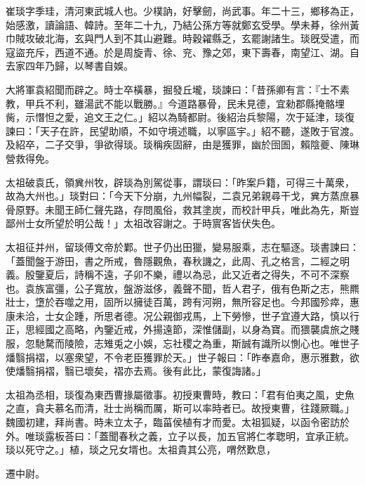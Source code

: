 \begin{pinyinscope}


崔琰字季珪，清河東武城人也。少樸訥，好擊劒，尚武事。年二十三，鄉移為正，始感激，讀論語、韓詩。至年二十九，乃結公孫方等就鄭玄受學。學未朞，徐州黃巾賊攻破北海，玄與門人到不其山避難。時穀糴縣乏，玄罷謝諸生。琰旣受遣，而寇盜充斥，西道不通。於是周旋青、徐、兖、豫之郊，東下壽春，南望江、湖。自去家四年乃歸，以琴書自娛。




大將軍袁紹聞而辟之。時士卒橫暴，掘發丘壠，琰諫曰：「昔孫卿有言：『士不素教，甲兵不利，雖湯武不能以戰勝。』今道路暴骨，民未見德，宜勑郡縣掩骼埋胔，示憯怛之愛，追文王之仁。」紹以為騎都尉。後紹治兵黎陽，次于延津，琰復諫曰：「天子在許，民望助順，不如守境述職，以寧區宇。」紹不聽，遂敗于官渡。及紹卒，二子交爭，爭欲得琰。琰稱疾固辭，由是獲罪，幽於囹圄，賴陰夔、陳琳營救得免。




太祖破袁氏，領兾州牧，辟琰為別駕從事，謂琰曰：「昨案戶籍，可得三十萬衆，故為大州也。」琰對曰：「今天下分崩，九州幅裂，二袁兄弟親尋干戈，兾方蒸庶暴骨原野。未聞王師仁聲先路，存問風俗，救其塗炭，而校計甲兵，唯此為先，斯豈鄙州士女所望於明公哉！」太祖改容謝之。于時賔客皆伏失色。




太祖征并州，留琰傅文帝於鄴。世子仍出田獵，變易服乘，志在驅逐。琰書諫曰：「蓋聞盤于游田，書之所戒，魯隱觀魚，春秋譏之，此周、孔之格言，二經之明義。殷鑒夏后，詩稱不遠，子卯不樂，禮以為忌，此又近者之得失，不可不深察也。袁族富彊，公子寬放，盤游滋侈，義聲不聞，哲人君子，俄有色斯之志，熊羆壯士，墯於吞噬之用，固所以擁徒百萬，跨有河朔，無所容足也。今邦國殄瘁，惠康未洽，士女企踵，所思者德。况公親御戎馬，上下勞慘，世子宜遵大路，慎以行正，思經國之高略，內鑒近戒，外揚遠節，深惟儲副，以身為寶。而猥襲虞旅之賤服，忽馳騖而陵險，志雉兎之小娛，忘社稷之為重，斯誠有識所以惻心也。唯世子燔翳捐褶，以塞衆望，不令老臣獲罪於天。」世子報曰：「昨奉嘉命，惠示雅數，欲使燔翳捐褶，翳已壞矣，褶亦去焉。後有此比，蒙復誨諸。」




太祖為丞相，琰復為東西曹掾屬徵事。初授東曹時，教曰：「君有伯夷之風，史魚之直，貪夫慕名而清，壯士尚稱而厲，斯可以率時者已。故授東曹，往踐厥職。」魏國初建，拜尚書。時未立太子，臨菑侯植有才而愛。太祖狐疑，以函令密訪於外。唯琰露板荅曰：「蓋聞春秋之義，立子以長，加五官將仁孝聦明，宜承正統。琰以死守之。」植，琰之兄女壻也。太祖貴其公亮，喟然歎息，


遷中尉。



\end{pinyinscope}
